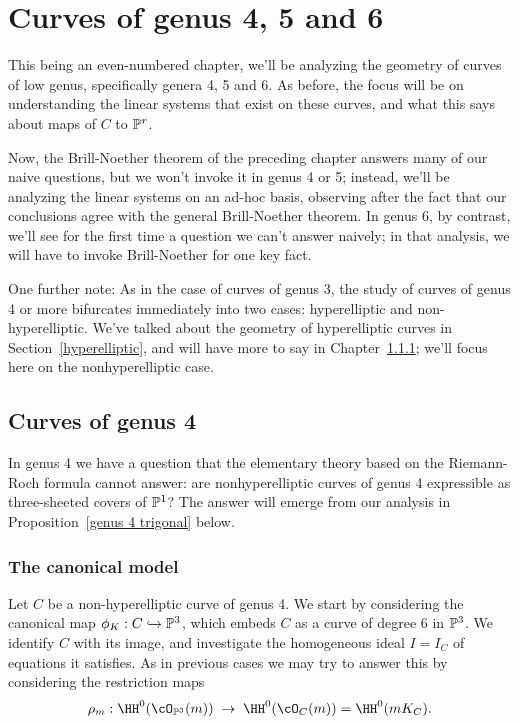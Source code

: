 

\chapter{Curves of genus 4, 5 and 6}\label{genus 4, 5 and 6 chapter}

This being an even-numbered chapter, we'll be analyzing the geometry of curves of low genus, specifically genera 4, 5 and 6. As before, the focus will be on understanding the linear systems that exist on these curves, and what this says about maps of $C$ to $\PP^r$. 

Now, the Brill-Noether theorem of the preceding chapter answers many of our naive questions, but we won't invoke it in genus 4 or 5; instead, we'll be analyzing the linear systems on an ad-hoc basis, observing after the fact that our conclusions agree with the general Brill-Noether theorem. In genus 6, by contrast, we'll see for the first time a question we can't answer naively; in that analysis, we will have to invoke Brill-Noether for one key fact.

One further note: As in the case of curves of genus 3, the study of curves of genus 4 or more bifurcates immediately into two cases: hyperelliptic and non-hyperelliptic. We've talked about the geometry of hyperelliptic curves in Section~\ref{hyperelliptic}, and will have more to say in Chapter~\ref{}; we'll focus here on the nonhyperelliptic case.


\section{Curves of genus 4}


In genus 4 we have a question that the elementary theory based on the Riemann-Roch formula cannot answer: are nonhyperelliptic curves of genus 4 expressible as three-sheeted covers of $\PP^1$? The answer will emerge from our analysis in Proposition~\ref{genus 4 trigonal} below. 

\subsection{The canonical model}

Let $C$ be a non-hyperelliptic curve of genus 4. We start by considering the canonical map $\phi_K : C \hookrightarrow \PP^3$, which embeds $C$ as a curve of degree 6 in $\PP^3$. We identify $C$ with its image, and investigate the homogeneous ideal $I = I_C$ of equations it satisfies. As in previous cases we may try to answer this by considering the restriction maps
$$
\rho_m : \HH^0(\cO_{\PP^3}(m)) \; \to \; \HH^0(\cO_{C}(m)) = \HH^0(mK_C).
$$

